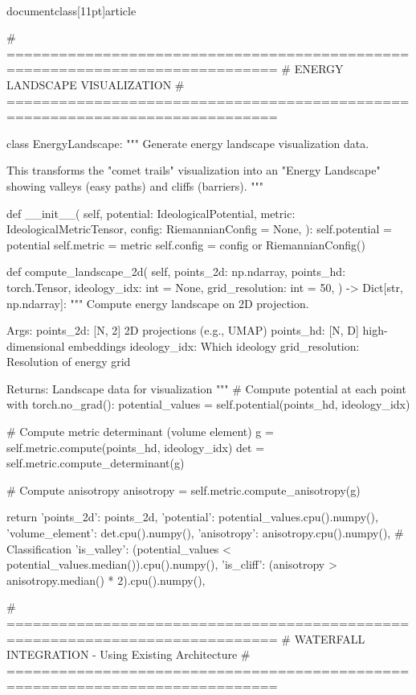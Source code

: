 \\documentclass[11pt]{article}
\begin{document}
\begin{CodeBlock}
# =============================================================================
# ENERGY LANDSCAPE VISUALIZATION
# =============================================================================

class EnergyLandscape:
    """
    Generate energy landscape visualization data.

    This transforms the "comet trails" visualization into an
    "Energy Landscape" showing valleys (easy paths) and cliffs (barriers).
    """

    def __init__(
        self,
        potential: IdeologicalPotential,
        metric: IdeologicalMetricTensor,
        config: RiemannianConfig = None,
    ):
        self.potential = potential
        self.metric = metric
        self.config = config or RiemannianConfig()

    def compute_landscape_2d(
        self,
        points_2d: np.ndarray,
        points_hd: torch.Tensor,
        ideology_idx: int = None,
        grid_resolution: int = 50,
    ) -> Dict[str, np.ndarray]:
        """
        Compute energy landscape on 2D projection.

        Args:
            points_2d: [N, 2] 2D projections (e.g., UMAP)
            points_hd: [N, D] high-dimensional embeddings
            ideology_idx: Which ideology
            grid_resolution: Resolution of energy grid

        Returns:
            Landscape data for visualization
        """
        # Compute potential at each point
        with torch.no_grad():
            potential_values = self.potential(points_hd, ideology_idx)

        # Compute metric determinant (volume element)
        g = self.metric.compute(points_hd, ideology_idx)
        det = self.metric.compute_determinant(g)

        # Compute anisotropy
        anisotropy = self.metric.compute_anisotropy(g)

        return {
            'points_2d': points_2d,
            'potential': potential_values.cpu().numpy(),
            'volume_element': det.cpu().numpy(),
            'anisotropy': anisotropy.cpu().numpy(),
            # Classification
            'is_valley': (potential_values < potential_values.median()).cpu().numpy(),
            'is_cliff': (anisotropy > anisotropy.median() * 2).cpu().numpy(),
        }


# =============================================================================
# WATERFALL INTEGRATION - Using Existing Architecture
# =============================================================================


\end{CodeBlock}
\end{document}
